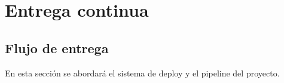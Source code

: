 
\section{Entrega continua}\label{cd:entrega-continua}

\subsection{Flujo de entrega}\label{cd:flujo-de-entrega}
En esta sección se abordará el sistema de deploy y el pipeline del proyecto.
